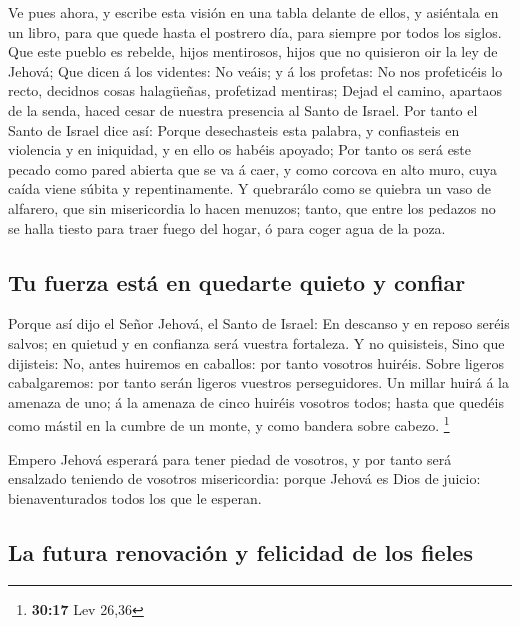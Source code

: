  Ve pues ahora, y escribe esta visión en una tabla delante
de ellos, y asiéntala en un libro, para que quede hasta el postrero día,
para siempre por todos los siglos.  Que este pueblo es
rebelde, hijos mentirosos, hijos que no quisieron oir la ley de Jehová;
 Que dicen á los videntes: No veáis; y á los profetas: No
nos profeticéis lo recto, decidnos cosas halagüeñas, profetizad
mentiras;  Dejad el camino, apartaos de la senda, haced
cesar de nuestra presencia al Santo de Israel.  Por tanto
el Santo de Israel dice así: Porque desechasteis esta palabra, y
confiasteis en violencia y en iniquidad, y en ello os habéis apoyado;
 Por tanto os será este pecado como pared abierta que se va
á caer, y como corcova en alto muro, cuya caída viene súbita y
repentinamente.  Y quebrarálo como se quiebra un vaso de
alfarero, que sin misericordia lo hacen menuzos; tanto, que entre los
pedazos no se halla tiesto para traer fuego del hogar, ó para coger agua
de la poza.

\hypertarget{tu-fuerza-estuxe1-en-quedarte-quieto-y-confiar}{%
\subsection{Tu fuerza está en quedarte quieto y
confiar}\label{tu-fuerza-estuxe1-en-quedarte-quieto-y-confiar}}

 Porque así dijo el Señor Jehová, el Santo de Israel: En
descanso y en reposo seréis salvos; en quietud y en confianza será
vuestra fortaleza. Y no quisisteis,  Sino que dijisteis:
No, antes huiremos en caballos: por tanto vosotros huiréis. Sobre
ligeros cabalgaremos: por tanto serán ligeros vuestros perseguidores.
 Un millar huirá á la amenaza de uno; á la amenaza de cinco
huiréis vosotros todos; hasta que quedéis como mástil en la cumbre de un
monte, y como bandera sobre cabezo. \footnote{\textbf{30:17} Lev 26,36}

 Empero Jehová esperará para tener piedad de vosotros, y
por tanto será ensalzado teniendo de vosotros misericordia: porque
Jehová es Dios de juicio: bienaventurados todos los que le esperan.

\hypertarget{la-futura-renovaciuxf3n-y-felicidad-de-los-fieles}{%
\subsection{La futura renovación y felicidad de los
fieles}\label{la-futura-renovaciuxf3n-y-felicidad-de-los-fieles}}

